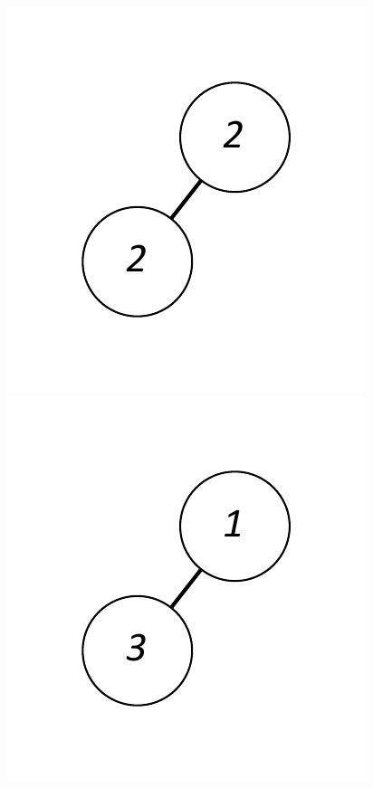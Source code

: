 \documentclass[12pt]{article}
\theoremstyle{plain}
\theoremstyle{definition}
\theoremstyle{remark}
\begin{document}
	\begin{figure}[htb]
		\includegraphics[scale=0.25]{Delta3TriangleFree/1[2,2].pdf}
		\includegraphics[scale=0.25]{Delta3TriangleFree/1[3,1].pdf}

\end{figure}
\end{document}

